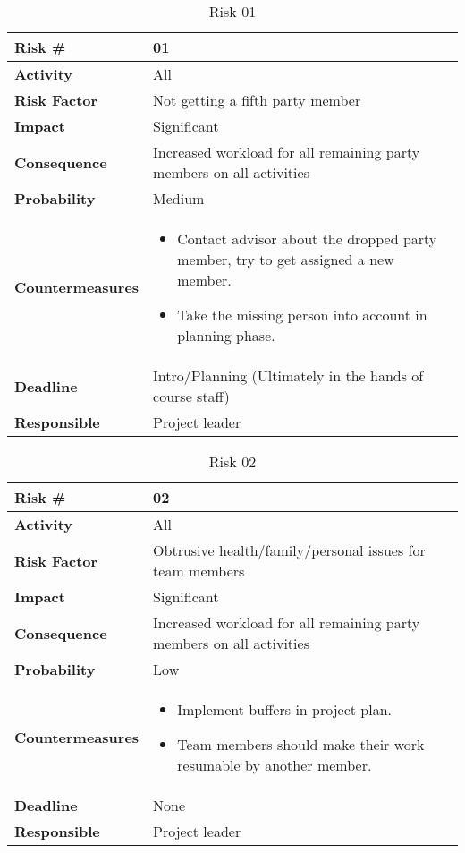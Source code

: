 \begin{table}
\begin{tabularx}{\textwidth}{ | l | X | }
\hline
\textbf{Risk \#} & 01 \\ \hline
\textbf{Activity} & All \\ \hline
\textbf{Risk Factor} & Not getting a fifth party member \\ \hline
\textbf{Impact} & Significant \\ \hline
\textbf{Consequence} & Increased workload for all remaining party members on all activities \\ \hline
\textbf{Probability} & Medium \\ \hline
\textbf{Countermeasures} & \begin{itemize}
  \item  Contact advisor about the dropped party member, try to get assigned a new member.
  \item Take the missing person into account in planning phase.
\end{itemize}  \\ \hline
\textbf{Deadline} & Intro/Planning (Ultimately in the hands of course staff) \\ \hline
\textbf{Responsible} & Project leader \\ \hline
\end{tabularx}
\caption{Risk 01}
\end{table}

\medskip

\begin{table}
\begin{tabularx}{\textwidth}{ | l | X | }
\hline
\textbf{Risk \#} & 02 \\ \hline
\textbf{Activity} & All \\ \hline
\textbf{Risk Factor} & Obtrusive health/family/personal issues for team members \\ \hline
\textbf{Impact} & Significant \\ \hline
\textbf{Consequence} & Increased workload for all remaining party members on all activities \\ \hline
\textbf{Probability} & Low  \\ \hline
\textbf{Countermeasures} & \begin{itemize}
  \item Implement buffers in project plan.
  \item Team members should make their work resumable by another member.
\end{itemize}  \\ \hline
\textbf{Deadline} &  None \\ \hline
\textbf{Responsible} & Project leader \\ \hline
\end{tabularx}
\caption{Risk 02}
\end{table}

